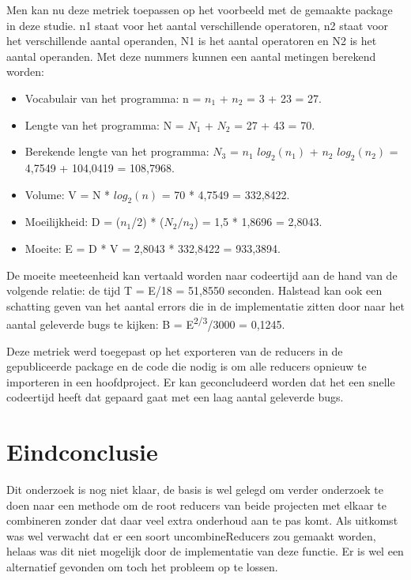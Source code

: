 Men kan nu deze metriek toepassen op het voorbeeld met de gemaakte package in deze studie. n1 staat voor het aantal verschillende operatoren, n2 staat voor het verschillende aantal operanden, N1 is het aantal operatoren en N2 is het aantal operanden. Met deze nummers kunnen een aantal metingen berekend worden:
\begin{itemize}
	\item Vocabulair van het programma: n = $n_1$ + $n_2$ = 3 + 23 = 27.
	\item Lengte van het programma: N = $N_1$ + $N_2$ = 27 + 43 = 70.
	\item Berekende lengte van het programma: $N_3$ = $n_1$ $log_{2}(n_1)$ + $n_2$ $log_{2}(n_2)$ = 4,7549 +  104,0419 = 108,7968.
	\item Volume: V = N * $log_{2}(n)$ = 70 * 4,7549 = 332,8422.
	\item Moeilijkheid: D = ($n_1$/2) * ($N_2/n_2$) = 1,5 * 1,8696 = 2,8043.
	\item Moeite: E = D * V = 2,8043 * 332,8422 = 933,3894.
\end{itemize}
De moeite meeteenheid kan vertaald worden naar codeertijd aan de hand van de volgende relatie: de tijd T = E/18 = 51,8550 seconden.
Halstead kan ook een schatting geven van het aantal errors die in de implementatie zitten door naar het aantal geleverde bugs te kijken: B = E\textsuperscript{2/3}/3000 = 0,1245.

Deze metriek werd toegepast op het exporteren van de reducers in de gepubliceerde package en de code die nodig is om alle reducers opnieuw te importeren in een hoofdproject. Er kan geconcludeerd worden dat het een snelle codeertijd heeft dat gepaard gaat met een laag aantal geleverde bugs.

 





\section{Eindconclusie}
Dit onderzoek is nog niet klaar, de basis is wel gelegd om verder onderzoek te doen naar een methode om de root reducers van beide projecten met elkaar te combineren zonder dat daar veel extra onderhoud aan te pas komt. Als uitkomst was wel verwacht dat er een soort uncombineReducers zou gemaakt worden, helaas was dit niet mogelijk door de implementatie van deze functie. Er is wel een alternatief gevonden om toch het probleem op te lossen. 

